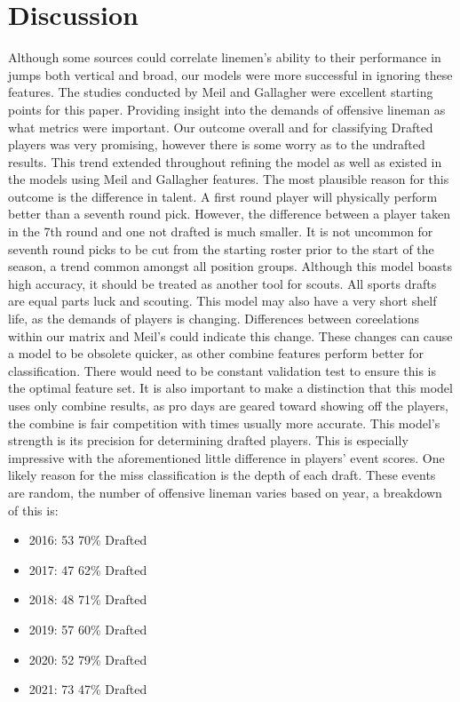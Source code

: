 \documentclass[confrence]{IEEEtran}
\begin{document}
\section*{Discussion}
Although some sources could correlate linemen's ability to their performance in jumps both vertical and broad, our models were more successful in ignoring these features.
The studies conducted by Meil and Gallagher were excellent starting points for this paper. Providing insight into the demands of offensive lineman as what metrics were important.
Our outcome overall and for classifying Drafted players was very promising, however there is some worry as to the undrafted results.
This trend extended throughout refining the model as well as existed in the models using Meil and Gallagher features.
The most plausible reason for this outcome is the difference in talent. A first round player will physically perform better than a seventh round pick. However, the difference between a player taken in the 7th round and one not drafted is much smaller.
It is not uncommon for seventh round picks to be cut from the starting roster prior to the start of the season, a trend common amongst all position groups.
Although this model boasts high accuracy, it should be treated as another tool for scouts. All sports drafts are equal parts luck and scouting.
This model may also have a very short shelf life, as the demands of players is changing. Differences between coreelations within our matrix and Meil's could indicate this change.
These changes can cause a model to be obsolete quicker, as other combine features perform better for classification.
There would need to be constant validation test to ensure this is the optimal feature set.
It is also important to make a distinction that this model uses only combine results, as pro days are geared toward showing off the players, the combine is fair competition with times usually more accurate.
This model's strength is its precision for determining drafted players. This is especially impressive with the aforementioned little difference in players' event scores.
One likely reason for the miss classification is the depth of each draft. These events are random, the number of offensive lineman varies based on year, a breakdown of this is:
\begin{itemize}
    \item 2016: 53 70\% Drafted
    \item 2017: 47 62\% Drafted
    \item 2018: 48 71\% Drafted
    \item 2019: 57 60\% Drafted
    \item 2020: 52 79\% Drafted
    \item 2021: 73 47\% Drafted
\end{itemize}
\end{document}
